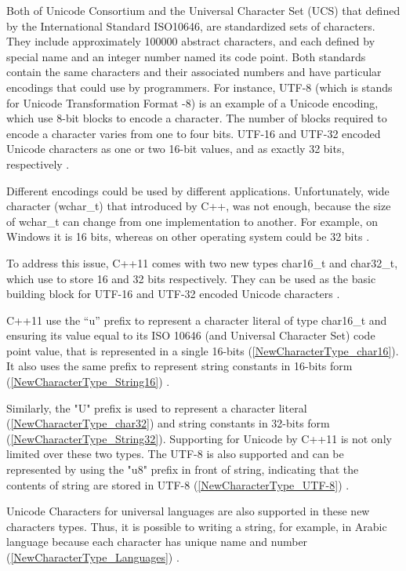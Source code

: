 \documentclass[11pt]{report}
\begin{document}
Both of Unicode Consortium and the Universal Character Set (UCS) that defined by the International Standard ISO10646, are standardized sets of characters. They include approximately 100000 abstract characters, and each defined by special name and an integer number named its code point. Both standards contain the same characters and their associated numbers and have particular encodings that could use by programmers. For instance, UTF-8 (which is stands for Unicode Transformation Format -8) is an example of a Unicode encoding, which use 8-bit blocks to encode a character. The number of blocks required to encode a character varies from one to four bits.  UTF-16 and UTF-32 encoded Unicode characters as one or two 16-bit values, and as exactly 32 bits, respectively \cite{Gregorie:professionalcpp}.


Different encodings could be used by different applications. Unfortunately, wide character (wchar\_t) that introduced by C++, was not enough, because the size of wchar\_t can change from one implementation to another. For example, on Windows it is 16 bits, whereas on other operating system could be 32 bits \cite{Gregorie:professionalcpp}. 


To address this issue, C++11 comes with two new types char16\_t and char32\_t, which use to store 16 and 32 bits respectively. They can be used as the basic building block for UTF-16 and UTF-32 encoded Unicode characters \cite{Josuttis:2012:CppStandardLibrary}.


C++11 use the “u” prefix to represent a character literal of type char16\_t and ensuring its value equal to its ISO 10646 (and Universal Character Set) code point value, that is represented in a single 16-bits (\ref{NewCharacterType_char16}). It also uses the same prefix to represent string constants in 16-bits form (\ref{NewCharacterType_String16}) \cite{Josuttis2012:CppStandardLibrary}.


Similarly, the "U" prefix is used to represent a character literal (\ref{NewCharacterType_char32}) and string constants in 32-bits form (\ref{NewCharacterType_String32}).  Supporting for Unicode by C++11 is not only limited over these two types. The UTF-8 is also supported and can be represented by using the "u8" prefix in front of string, indicating that the contents of string are stored in UTF-8 (\ref{NewCharacterType_UTF-8}) \cite{Josuttis:2012:CppStandardLibrary}.


Unicode Characters for universal languages are also supported in these new characters types. Thus, it is possible to writing a string, for example, in Arabic language because each character has unique name and number (\ref{NewCharacterType_Languages}) \cite{Josuttis:2012:CppStandardLibrary}.
\end{document}
